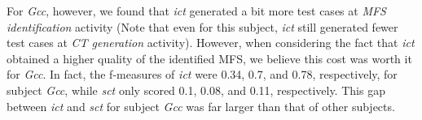 \documentclass[journal,12pt,onecolumn,draftclsnofoot,]{IEEEtran}
\begin{document}
For \emph{Gcc}, however, we found that \emph{ict} generated a bit more test cases at \emph{MFS identification} activity (Note that even for this subject, \emph{ict} still generated fewer test cases at \emph{CT generation} activity). However, when considering the fact that \emph{ict} obtained a higher quality of the identified MFS, we believe this cost was worth it for \emph{Gcc}. In fact, the f-measures of \emph{ict} were 0.34, 0.7, and 0.78, respectively, for subject \emph{Gcc}, while \emph{sct} only scored 0.1, 0.08, and 0.11, respectively. This gap between \emph{ict} and \emph{sct} for subject \emph{Gcc} was far larger than that of other subjects.






\end{document}
